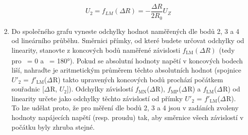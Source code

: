 \documentclass[a4paper,12pt]{article}   %
\newcommand{\var}[2]{$#1_\text{#2}$}
\begin{document}
\begin{enumerate}
      \begin{equation}
        U_2 = f_{LM}(\Delta R) = -\frac{\Delta R}{2R_0}U_Z
      \end{equation}
      \item Do společného grafu vyneste odchylky hodnot naměřených dle bodů 2, 3 a 4 od lineárního průběhu. Směrnici přímky, od které budete určovat odchylky od linearity, stanovte z koncových bodů naměřené závislosti \var{f}{LM}\var{(\Delta R)}{} (tedy pro \textalpha\ = 0 a \textalpha\ = 180°). Pokud se absolutní hodnoty napětí v koncových bodech liší, nahraďte je aritmetickým průměrem těchto absolutních hodnot (spojnice \var{U'}{2} = \var{f'}{LM}(\var{\Delta}{}R) takto upravených koncových bodů prochází počátkem souřadnic [\var{\Delta}{}R, \var{U}{2}]). Odchylky závislostí \var{f}{MN}(\var{\Delta}{}R), \var{f}{MP}(\var{\Delta}{}R) a \var{f}{LM}(\var{\Delta}{}R) od linearity určete jako odchylky těchto závislostí od přímky \var{U'}{2} = \var{f'}{LM}(\var{\Delta}{}R). To lze udělat proto, že pro měření dle bodů 2, 3 a 4 jsou v zadáních zvoleny hodnoty napájecích napětí (resp. proudu) tak, aby směrnice všech závislostí v počátku byly zhruba stejné.
\end{enumerate}
\end{document}

